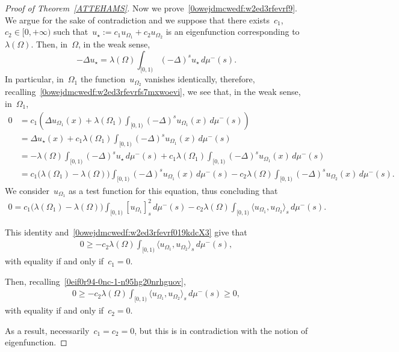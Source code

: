 \documentclass[12pt,a4paper,intlimits,sumlimits]{amsart}
\theoremstyle{definition}
\theoremstyle{plain}
\numberwithin{equation}{section}
\renewcommand{\ge}{\geqslant}
\begin{document}
\begin{proof}[Proof of Theorem~\ref{ATTEHAMS}]
Now we prove~\eqref{0owejdmcwedf:w2ed3rfevrf9}. We argue for the sake of contradiction and we suppose that there exists~$c_1$, $c_2\in[0,+\infty)$ such
that~$u_\star:=c_1u_{\Omega_1}+c_2u_{\Omega_2}$ is an
eigenfunction corresponding to~$ \lambda(\Omega)$.
Then, in~$\Omega$, in the weak sense,
$$ -\Delta u_\star= \lambda(\Omega) \int_{[0,1)}(-\Delta)^s u_\star\,d\mu^-(s) .$$
In particular, in~$\Omega_1$ the function~$u_{\Omega_2}$ vanishes identically, therefore, recalling~\eqref{0owejdmcwedf:w2ed3rfevrfs7mxwoevi}, we see that,
in the weak sense, in~$\Omega_1$,
\begin{equation*}
\begin{split}
0&=c_1\left(\Delta u_{\Omega_1}(x)+\lambda(\Omega_1)\int_{[0,1)}(-\Delta)^s u_{\Omega_1}(x)\,d\mu^-(s)\right)\\&=
\Delta u_\star(x)+c_1\lambda(\Omega_1)\int_{[0,1)}(-\Delta)^s u_{\Omega_1}(x)\,d\mu^-(s)\\&=
-\lambda(\Omega) \int_{[0,1)}(-\Delta)^s u_\star\,d\mu^-(s)
+c_1\lambda(\Omega_1)\int_{[0,1)}(-\Delta)^s u_{\Omega_1}(x)\,d\mu^-(s)\\&=
c_1\Big(\lambda(\Omega_1)-\lambda(\Omega)\Big)\int_{[0,1)}(-\Delta)^s u_{\Omega_1}(x)\,d\mu^-(s)-c_2\lambda(\Omega)\int_{[0,1)}(-\Delta)^s u_{\Omega_2}(x)\,d\mu^-(s).
\end{split}
\end{equation*}
We consider~$u_{\Omega_1}$ as a test function for this equation,
thus concluding that
\begin{equation*}
\begin{split}
0=
c_1\Big(\lambda(\Omega_1)-\lambda(\Omega)\Big)\int_{[0,1)}[ u_{\Omega_1}
]^2_s\,d\mu^-(s)-c_2\lambda(\Omega)\int_{[0,1)}
\langle u_{\Omega_1},u_{\Omega_2}\rangle_s\,d\mu^-(s).
\end{split}
\end{equation*}

This identity and~\eqref{0owejdmcwedf:w2ed3rfevrf019kdcX3} give that
\begin{equation*}\begin{split}0\ge-c_2\lambda(\Omega)\int_{[0,1)}
\langle u_{\Omega_1},u_{\Omega_2}\rangle_s\,d\mu^-(s),
\end{split}\end{equation*}
with equality if and only if~$c_1=0$.

Then, recalling~\eqref{0eif0r94-0nc-1-n95hg20nrhguov},
\begin{equation*}\begin{split}0\ge-c_2\lambda(\Omega)\int_{[0,1)}
\langle u_{\Omega_1},u_{\Omega_2}\rangle_s\,d\mu^-(s)\ge0,
\end{split}\end{equation*}
with equality if and only if~$c_2=0$.

As a result, necessarily~$c_1=c_2=0$,
but this is in contradiction with the notion of eigenfunction.
\end{proof}
\end{document}
